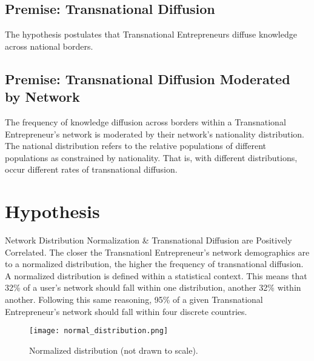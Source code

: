 \subsection{Premise: Transnational Diffusion}
The hypothesis postulates that Transnational Entrepreneurs diffuse
knowledge across national borders.

\subsection{Premise: Transnational Diffusion Moderated by Network}
The frequency of knowledge diffusion across borders within a
Transnational Entrepreneur's network is moderated by their network's
nationality distribution. The national distribution refers to the
relative populations of different populations as constrained by
nationality. That is, with different distributions, occur different
rates of transnational diffusion.

\section{Hypothesis}
Network Distribution Normalization \& Transnational Diffusion are
Positively Correlated. The closer the Transnationl Entrepreneur's
network demographics are to a normalized distribution, the higher the
frequency of transnational diffusion. A normalized distribution is
defined within a statistical context. This means that 32\% of a user's
network should fall within one distribution, another 32\% within
another. Following this same reasoning, 95\% of a given Transnational
Entrepreneur's network should fall within four discrete countries.
\begin{figure}[!ht]
  \centering
  \texttt{[image: normal\_distribution.png]}
  \caption{Normalized distribution (not drawn to scale).}
\end{figure}
